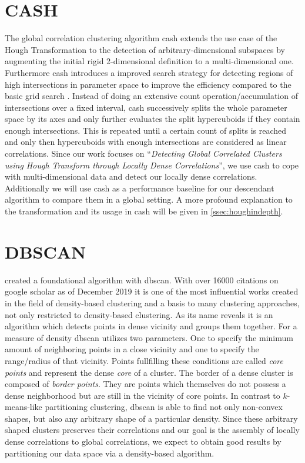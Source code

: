 \section{CASH}\label{sec:cashintro}
The global correlation clustering algorithm \gls{cash} extends the use case of the Hough Transformation to the detection of arbitrary-dimensional subspaces by augmenting the initial rigid 2-dimensional definition to a multi-dimensional one. Furthermore \gls{cash} introduces a improved search strategy for detecting regions of high intersections in parameter space to improve the efficiency compared to the basic grid search \cite{CASHachtert2008global}. Instead of doing an extensive count operation/accumulation of intersections over a fixed interval, \gls{cash} successively splits the whole parameter space by its axes and only further evaluates the split hypercuboids if they contain enough intersections. This is repeated until a certain count of splits is reached and only then hypercuboids with enough intersections are considered as linear correlations. Since our work focuses on ``\textit{Detecting Global Correlated Clusters using Hough Transform through Locally Dense Correlations}'', we use \gls{cash} to cope with multi-dimensional data and detect our locally dense correlations. Additionally we will use \gls{cash} as a performance baseline for our descendant algorithm to compare them in a global setting.
A more profound explanation to the transformation and its usage in \gls{cash} will be given in \autoref{ssec:houghindepth}.


\section{DBSCAN}\label{sec:dbscanintro}
\citeauthor{DBSCANEKSX96} created a foundational algorithm with \gls{dbscan}. With over 16000 citations on google scholar as of December 2019 it is one of the most influential works created in the field of density-based clustering and a basis to many clustering approaches, not only restricted to density-based clustering. As its name reveals it is an algorithm which detects points in dense vicinity and groups them together. For a measure of density \gls{dbscan} utilizes two parameters. One to specify the minimum amount of neighboring points in a close vicinity and one to specify the range/radius of that vicinity. Points fullfilling these conditions are called \textit{core points} and represent the dense \textit{core} of a cluster. The border of a dense cluster is composed of \textit{border points}. They are points which themselves do not possess a dense neighborhood but are still in the vicinity of core points. In contrast to $k$-means-like partitioning clustering\cite{kmeansmacqueen1967some}, \gls{dbscan} is able to find not only non-convex shapes, but also any arbitrary shape of a particular density. Since these arbitrary shaped clusters preserves their correlations and our goal is the assembly of locally dense correlations to global correlations, we expect to obtain good results by partitioning our data space via a density-based algorithm.

